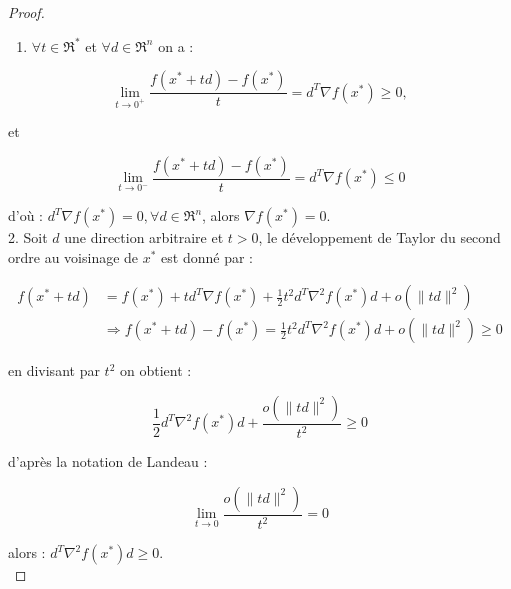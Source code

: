 \documentclass[a4paper,12pt,openany]{book}
\theoremstyle{plain}
\theoremstyle{definition}
\theoremstyle{remark}
\theoremstyle{nbstyle}
\begin{document}
	\begin{proof}
		\begin{enumerate}
			\item $\forall t \in \Re^{*}$ et $\forall d \in \Re^{n}$ on a :
		\end{enumerate}
		
		$$
		\lim _{t \rightarrow 0^{+}} \frac{f\left(x^{*}+t d\right)-f\left(x^{*}\right)}{t}=d^{T} \nabla f\left(x^{*}\right) \geq 0,
		$$
		
		et
		
		$$
		\lim _{t \rightarrow 0^{-}} \frac{f\left(x^{*}+t d\right)-f\left(x^{*}\right)}{t}=d^{T} \nabla f\left(x^{*}\right) \leq 0
		$$
		
		d'où : $d^{T} \nabla f\left(x^{*}\right)=0, \forall d \in \Re^{n}$, alors $\nabla f\left(x^{*}\right)=0$.\\
		2. Soit $d$ une direction arbitraire et $t>0$, le développement de Taylor du second ordre au voisinage de $x^{*}$ est donné par :
		
		$$
		\begin{aligned}
		f\left(x^{*}+t d\right) & =f\left(x^{*}\right)+t d^{T} \nabla f\left(x^{*}\right)+\frac{1}{2} t^{2} d^{T} \nabla^{2} f\left(x^{*}\right) d+o\left(\|t d\|^{2}\right) \\
		& \Longrightarrow f\left(x^{*}+t d\right)-f\left(x^{*}\right)=\frac{1}{2} t^{2} d^{T} \nabla^{2} f\left(x^{*}\right) d+o\left(\|t d\|^{2}\right) \geq 0
		\end{aligned}
		$$
		
		en divisant par $t^{2}$ on obtient :
		
		$$
		\frac{1}{2} d^{T} \nabla^{2} f\left(x^{*}\right) d+\frac{o\left(\|t d\|^{2}\right)}{t^{2}} \geq 0
		$$
		
		d'après la notation de Landeau :
		
		$$
		\lim _{t \rightarrow 0} \frac{o\left(\|t d\|^{2}\right)}{t^{2}}=0
		$$
		
		alors : $d^{T} \nabla^{2} f\left(x^{*}\right) d \geq 0$.\\
	\end{proof}
	
\end{document}
